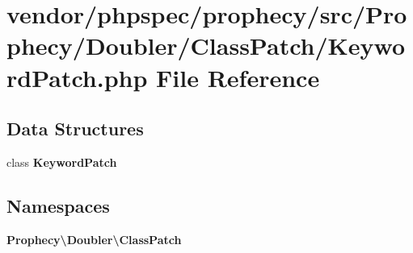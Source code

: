 \section{vendor/phpspec/prophecy/src/\+Prophecy/\+Doubler/\+Class\+Patch/\+Keyword\+Patch.php File Reference}
\label{_keyword_patch_8php}
\subsection*{Data Structures}
\begin{DoxyCompactItemize}
\item 
class {\bf Keyword\+Patch}
\end{DoxyCompactItemize}
\subsection*{Namespaces}
\begin{DoxyCompactItemize}
\item 
 {\bf Prophecy\textbackslash{}\+Doubler\textbackslash{}\+Class\+Patch}
\end{DoxyCompactItemize}
